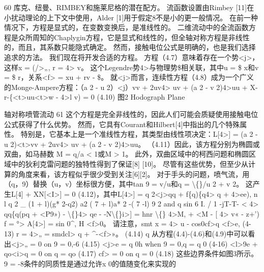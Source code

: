 \documentclass[UTF8,11pt,a4paper,openany,fontset=fandol]{ctexbook}
\begin{document}
60 库克、纽曼、RIMBEY和施莱尼格的潜在配方。 流函数设置由Rimbey [11]在小扰动理论的上下文中使用，Alder [1]用于假定8不是小的更一般情况。 在前一种情况下，方程是显式的，在变数变换后，是准线性的。 二维流动中的全流函数方程是众所周知的Chaplygin方程，它是显式和线性的，但全轴对称方程是非线性的，而且，其系数只能隐式确定。 然而，接触电位公式是明确的，也是我们选择追求的方法。 我们现在将开发合适的方程。 方程（4.7）意味着存在一个势<j>，这样x = (/>„, r = 4> v。 这个Legendre势4>与物理势\$相关联，其中u = \$ x和v = \$ r，关系<f> = xu + rv - \$。 就<j>而言，连续性方程（4.8）成为一个广义的Monge-Ampere方程：（a 2 - u 2）<j）vv + 2uv4> uv + (a 2 - v 2)4>uu + X-r-\{<t>uu<t>w - 4>l v) = 0 (4.10) 图2 Hodograph Plane

轴对称喷管流动 61 这个方程是完全非线性的，因此人们可能会质疑使用接触电位公式获得了什么优势。 然而，它具有Courant和Hilbert[4]中指出的几个特殊属性。 特别是，它基本上是一个准线性方程，其类型由线性项决定：L[4>] = (a 2 - u 2)<t>vv + 2uv4> uv + (a 2 - v 2)4>uu。 （4.11）因此，该方程分别为椭圆或双曲，如马赫数 M = q/a < 1或M > 1。 此外，双曲区域中的柯西问题和椭圆区域中的狄利克雷问题的独特性得到了保证[8] [10]。 尽管有这些优势，但至少从计算的角度来看，该方程似乎很少受到关注[6][2]。 对于手头的问题，喷气流，用（q，9）替换（u，v）坐标很方便，其中tan 9 = v/u和q = \textbackslash\{\}/u 2 + v 2。 这产生L[4] + XN[<I>] = 0 (4.12)，其中L[4>] = q 2<j>qq + f\{q)\{q4> q + 4>ee), n l q 2 \_ (1 + l)(g* 2-q2) a2 ( 7 + l)a* 2 -( 7 -l) 9 2 and q sin 6 I. / 1 -jT-T- < 4> qq\{q(pq + <P9») - \textbackslash\{\}4> qe - -N\textbackslash\{\}i>] = hnr \textbackslash\{\} 4>M, + <M - [ 4> v« - z+') f = °> A[4>] = sin 0\textasciicircum{}, H <f>0。 请注意，smt x = 4> u - cos0cf>q <f>e, (4-13) r = 4>„ = smdcl> q + \textasciicircum{}-<f>»。 (4.14) q 从方程(4.4)-(4.6)和(4.9)中可以看出<j>„ = 0 on 9 = 0,-6 (4.15) <j>e = q 0h when 9 = 0,q = q 0 (4-16) <l>9e + qo<i>q = 0 on q = qo (4.17) cf> = 0 on q = 0 (4.18) 这些边界条件如图3所示。 9 = -8条件的同质性是通过允许x 0的值随变化来实现的
\end{document}
